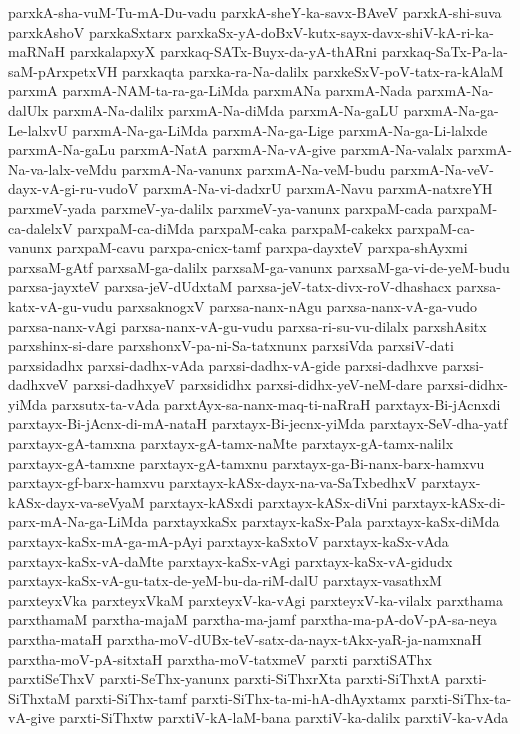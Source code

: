 {parxkA-sha-vuM-Tu-mA-Du-vadu
parxkA-sheY-ka-savx-BAveV
parxkA-shi-suva
parxkAshoV
parxkaSxtarx
parxkaSx-yA-doBxV-kutx-sayx-davx-shiV-kA-ri-ka-maRNaH
parxkalapxyX
parxkaq-SATx-Buyx-da-yA-thARni
parxkaq-SaTx-Pa-la-saM-pArxpetxVH
parxkaqta
parxka-ra-Na-dalilx
parxkeSxV-poV-tatx-ra-kAlaM
parxmA
parxmA-NAM-ta-ra-ga-LiMda
parxmANa
parxmA-Nada
parxmA-Na-dalUlx
parxmA-Na-dalilx
parxmA-Na-diMda
parxmA-Na-gaLU
parxmA-Na-ga-Le-lalxvU
parxmA-Na-ga-LiMda
parxmA-Na-ga-Lige
parxmA-Na-ga-Li-lalxde
parxmA-Na-gaLu
parxmA-NatA
parxmA-Na-vA-give
parxmA-Na-valalx
parxmA-Na-va-lalx-veMdu
parxmA-Na-vanunx
parxmA-Na-veM-budu
parxmA-Na-veV-dayx-vA-gi-ru-vudoV
parxmA-Na-vi-dadxrU
parxmA-Navu
parxmA-natxreYH
parxmeV-yada
parxmeV-ya-dalilx
parxmeV-ya-vanunx
parxpaM-cada
parxpaM-ca-dalelxV
parxpaM-ca-diMda
parxpaM-caka
parxpaM-cakekx
parxpaM-ca-vanunx
parxpaM-cavu
parxpa-cnicx-tamf
parxpa-dayxteV
parxpa-shAyxmi
parxsaM-gAtf
parxsaM-ga-dalilx
parxsaM-ga-vanunx
parxsaM-ga-vi-de-yeM-budu
parxsa-jayxteV
parxsa-jeV-dUdxtaM
parxsa-jeV-tatx-divx-roV-dhashacx
parxsa-katx-vA-gu-vudu
parxsaknogxV
parxsa-nanx-nAgu
parxsa-nanx-vA-ga-vudo
parxsa-nanx-vAgi
parxsa-nanx-vA-gu-vudu
parxsa-ri-su-vu-dilalx
parxshAsitx
parxshinx-si-dare
parxshonxV-pa-ni-Sa-tatxnunx
parxsiVda
parxsiV-dati
parxsidadhx
parxsi-dadhx-vAda
parxsi-dadhx-vA-gide
parxsi-dadhxve
parxsi-dadhxveV
parxsi-dadhxyeV
parxsididhx
parxsi-didhx-yeV-neM-dare
parxsi-didhx-yiMda
parxsutx-ta-vAda
parxtAyx-sa-nanx-maq-ti-naRraH
parxtayx-Bi-jAcnxdi
parxtayx-Bi-jAcnx-di-mA-nataH
parxtayx-Bi-jecnx-yiMda
parxtayx-SeV-dha-yatf
parxtayx-gA-tamxna
parxtayx-gA-tamx-naMte
parxtayx-gA-tamx-nalilx
parxtayx-gA-tamxne
parxtayx-gA-tamxnu
parxtayx-ga-Bi-nanx-barx-hamxvu
parxtayx-gf-barx-hamxvu
parxtayx-kASx-dayx-na-va-SaTxbedhxV
parxtayx-kASx-dayx-va-seVyaM
parxtayx-kASxdi
parxtayx-kASx-diVni
parxtayx-kASx-di-parx-mA-Na-ga-LiMda
parxtayxkaSx
parxtayx-kaSx-Pala
parxtayx-kaSx-diMda
parxtayx-kaSx-mA-ga-mA-pAyi
parxtayx-kaSxtoV
parxtayx-kaSx-vAda
parxtayx-kaSx-vA-daMte
parxtayx-kaSx-vAgi
parxtayx-kaSx-vA-gidudx
parxtayx-kaSx-vA-gu-tatx-de-yeM-bu-da-riM-dalU
parxtayx-vasathxM
parxteyxVka
parxteyxVkaM
parxteyxV-ka-vAgi
parxteyxV-ka-vilalx
parxthama
parxthamaM
parxtha-majaM
parxtha-ma-jamf
parxtha-ma-pA-doV-pA-sa-neya
parxtha-mataH
parxtha-moV-dUBx-teV-satx-da-nayx-tAkx-yaR-ja-namxnaH
parxtha-moV-pA-sitxtaH
parxtha-moV-tatxmeV
parxti
parxtiSAThx
parxtiSeThxV
parxti-SeThx-yanunx
parxti-SiThxrXta
parxti-SiThxtA
parxti-SiThxtaM
parxti-SiThx-tamf
parxti-SiThx-ta-mi-hA-dhAyxtamx
parxti-SiThx-ta-vA-give
parxti-SiThxtw
parxtiV-kA-laM-bana
parxtiV-ka-dalilx
parxtiV-ka-vAda
}
